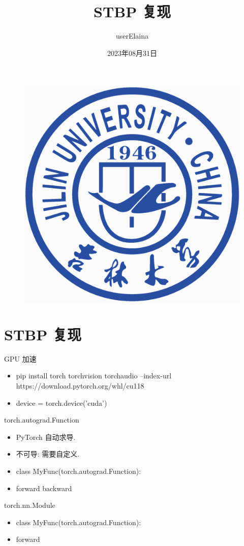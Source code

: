 \documentclass{beamer}
\author{userElaina}
\title{STBP 复现}
\subtitle{}
\institute{人工智能学院}
\date{2023年08月31日}
\begin{document}
\kaishu
\begin{frame}
    \titlepage
    \begin{figure}[htpb]
        \begin{center}
            \includegraphics[width=0.15\linewidth]{pic/Jilin_University_Logo.eps}
        \end{center}
    \end{figure}
\end{frame}

\begin{frame}
\tableofcontents[sectionstyle=show,subsectionstyle=show/shaded/hide,subsubsectionstyle=show/shaded/hide]
\end{frame}

\section{STBP 复现}

\begin{frame}{GPU 加速}
    \begin{itemize}
        \item pip install torch torchvision torchaudio --index-url https://download.pytorch.org/whl/cu118
        \item device = torch.device('cuda')
    \end{itemize}
\end{frame}

\begin{frame}{torch.autograd.Function}
    \begin{itemize}
        \item PyTorch 自动求导.
        \item 不可导: 需要自定义.
        \item class MyFunc(torch.autograd.Function):
        \item forward backward
    \end{itemize}
\end{frame}

\begin{frame}{torch.nn.Module}
    \begin{itemize}
        \item class MyFunc(torch.autograd.Function):
        \item forward
    \end{itemize}
\end{frame}
\end{document}
